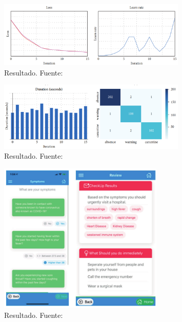 	\begin{figure}[H]
		\begin{center}
			\includegraphics[width=0.8\textwidth]{2/1_antecedentes/Resultado1-1.png}
		\caption{Resultado. Fuente: \cite{HealthChatBots-2022} }
	\end{center}
	\end{figure}
	\vspace{-10mm}
	\begin{figure}[H]
		\begin{center}
			\includegraphics[width=0.8\textwidth]{2/1_antecedentes/Resultado2-1.png}
		\caption{Resultado. Fuente: \cite{HealthChatBots-2022} }
	\end{center}
	\end{figure}
	\vspace{-10mm}
	\begin{figure}[H]
		\begin{center}
			\includegraphics[width=0.7\textwidth]{2/1_antecedentes/Resultado3-1.png}
		\caption{Resultado. Fuente: \cite{HealthChatBots-2022} }
	\end{center}
	\end{figure}
	\vspace{-10mm}
